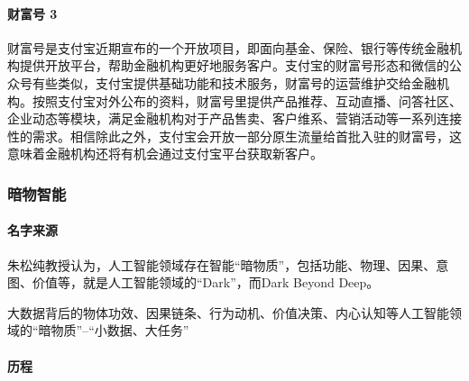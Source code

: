 \documentclass[letterpaper,11pt,english]{sphinxmanual}
\begin{document}
\paragraph{财富号 3\sphinxfootnotemark[313]}
\label{\detokenize{chapter_dive/alipay:id8}}%
\begin{footnotetext}[313]\sphinxAtStartFootnote
{}
%
\end{footnotetext}\ignorespaces 
财富号是支付宝近期宣布的一个开放项目，即面向基金、保险、银行等传统金融机构提供开放平台，帮助金融机构更好地服务客户。支付宝的财富号形态和微信的公众号有些类似，支付宝提供基础功能和技术服务，财富号的运营维护交给金融机构。按照支付宝对外公布的资料，财富号里提供产品推荐、互动直播、问答社区、企业动态等模块，满足金融机构对于产品售卖、客户维系、营销活动等一系列连接性的需求。相信除此之外，支付宝会开放一部分原生流量给首批入驻的财富号，这意味着金融机构还将有机会通过支付宝平台获取新客户。


\subsubsection{暗物智能}
\label{\detokenize{chapter_dive/dm-ai:id1}}\label{\detokenize{chapter_dive/dm-ai::doc}}

\paragraph{名字来源}
\label{\detokenize{chapter_dive/dm-ai:id2}}
朱松纯教授认为，人工智能领域存在智能“暗物质”，包括功能、物理、因果、意图、价值等，就是人工智能领域的“Dark”，而Dark
Beyond
Deep。%
\begin{footnote}[314]\sphinxAtStartFootnote
{}
%
\end{footnote}
大数据背后的物体功效、因果链条、行为动机、价值决策、内心认知等人工智能领域的“暗物质”–“小数据、大任务”


\paragraph{历程}
\label{\detokenize{chapter_dive/dm-ai:id3}}
\end{document}
